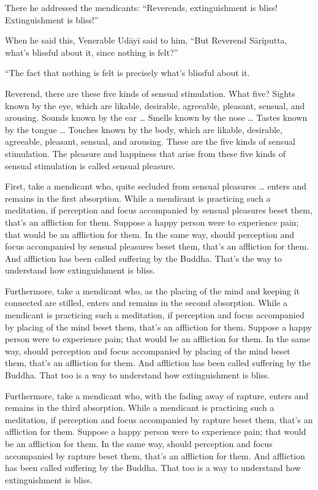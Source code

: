 \documentclass[12pt,openany]{book}%
\begin{document}
There he addressed the mendicants: “Reverends, extinguishment is bliss! Extinguishment is bliss!” 

When he said this, Venerable \textsanskrit{Udāyī} said to him, “But Reverend \textsanskrit{Sāriputta}, what’s blissful about it, since nothing is felt?” 

“The fact that nothing is felt is precisely what’s blissful about it. 

Reverend, there are these five kinds of sensual stimulation. What five? Sights known by the eye, which are likable, desirable, agreeable, pleasant, sensual, and arousing. Sounds known by the ear … Smells known by the nose … Tastes known by the tongue … Touches known by the body, which are likable, desirable, agreeable, pleasant, sensual, and arousing. These are the five kinds of sensual stimulation. The pleasure and happiness that arise from these five kinds of sensual stimulation is called sensual pleasure. 

First, take a mendicant who, quite secluded from sensual pleasures … enters and remains in the first absorption. While a mendicant is practicing such a meditation, if perception and focus accompanied by sensual pleasures beset them, that’s an affliction for them. Suppose a happy person were to experience pain; that would be an affliction for them. In the same way, should perception and focus accompanied by sensual pleasures beset them, that’s an affliction for them. And affliction has been called suffering by the Buddha. That’s the way to understand how extinguishment is bliss. 

Furthermore, take a mendicant who, as the placing of the mind and keeping it connected are stilled, enters and remains in the second absorption. While a mendicant is practicing such a meditation, if perception and focus accompanied by placing of the mind beset them, that’s an affliction for them. Suppose a happy person were to experience pain; that would be an affliction for them. In the same way, should perception and focus accompanied by placing of the mind beset them, that’s an affliction for them. And affliction has been called suffering by the Buddha. That too is a way to understand how extinguishment is bliss. 

Furthermore, take a mendicant who, with the fading away of rapture, enters and remains in the third absorption. While a mendicant is practicing such a meditation, if perception and focus accompanied by rapture beset them, that’s an affliction for them. Suppose a happy person were to experience pain; that would be an affliction for them. In the same way, should perception and focus accompanied by rapture beset them, that’s an affliction for them. And affliction has been called suffering by the Buddha. That too is a way to understand how extinguishment is bliss. 
\end{document}
